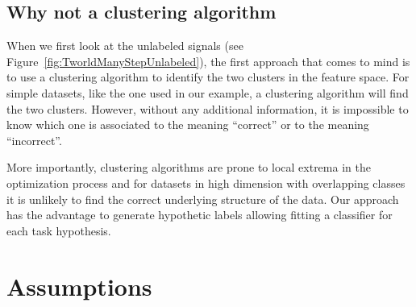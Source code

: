 

\subsection{Why not a clustering algorithm}
\label{chapter:lfui:whynotEM}

When we first look at the unlabeled signals (see Figure~\ref{fig:TworldManyStepUnlabeled}), the first approach that comes to mind is to use a clustering algorithm to identify the two clusters in the feature space. For simple datasets, like the one used in our example, a clustering algorithm will find the two clusters. However, without any additional information, it is impossible to know which one is associated to the meaning ``correct'' or to the meaning ``incorrect''.

More importantly, clustering algorithms are prone to local extrema in the optimization process and for datasets in high dimension with overlapping classes it is unlikely to find the correct underlying structure of the data. Our approach has the advantage to generate hypothetic labels allowing fitting a classifier for each task hypothesis. 


\section{Assumptions}
\label{chapter:lfui:assumptions}

